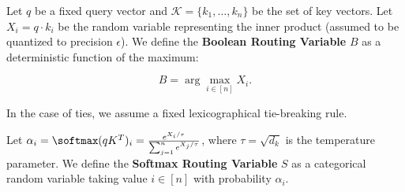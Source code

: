 \begin{definition}






\label{def:bool-rv}






Let $q$ be a fixed query vector and $\mathcal{K} = \{k_1, \dots, k_n\}$ be the set of key vectors. Let $X_i = q \cdot k_i$ be the random variable representing the inner product (assumed to be quantized to precision $\epsilon$). We define the \textbf{Boolean Routing Variable} $B$ as a deterministic function of the maximum:






\[






B = \arg\max_{i \in [n]} X_i.






\]






In the case of ties, we assume a fixed lexicographical tie-breaking rule.






\end{definition}













\begin{definition}






\label{def:softmax-rv}






Let $\alpha_i = \softmax(qK^T)_i = \frac{e^{X_i / \tau}}{\sum_{j=1}^n e^{X_j / \tau}}$, where $\tau = \sqrt{d_k}$ is the temperature parameter. We define the \textbf{Softmax Routing Variable} $S$ as a categorical random variable taking value $i \in [n]$ with probability $\alpha_i$.






\end{definition}













